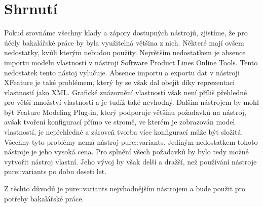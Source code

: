 \section{Shrnutí}
Pokud srovnáme všechny klady a zápory dostupných nástrojů, zjistíme, že pro účely bakalářské práce by byla využitelná většina z nich. Některé mají ovšem nedostatky, kvůli kterým nebudou použity. Největším nedostatkem je absence importu modelu vlastností v nástroji Software Product Lines Online Tools. Tento nedostatek tento nástoj vylučuje. Absence importu a exportu dat v nástroji XFeature je také problémem, který by se však dal obejít díky reprezentaci vlastností jako XML. Grafické znázornění vlastností však není příliš přehledné pro větší množství vlastností a je tudíž také nevhodný. Dalším nástrojem by mohl být Feature Modeling Plug-in, který podporuje většinu požadavků na nástroj, avšak tvoření konfigurací přímo ve stromě, ve kterém je zobrazován model vlastností, je nepřehledné a zároveň tvorba více konfigurací může být složitá. Všechny tyto problémy nemá nástroj pure::variants. Jediným nedostatkem tohoto nástroje je jeho vysoká cena. Pro splnění všech požadavků by bylo tedy možné vytvořit nástroj vlastní. Jeho vývoj by však delší a dražší, než používání nástroje pure::variants po dobu deseti let.

Z těchto důvodů je pure::variants nejvhodnějším nástrojem a bude použit pro potřeby bakalářské práce.

